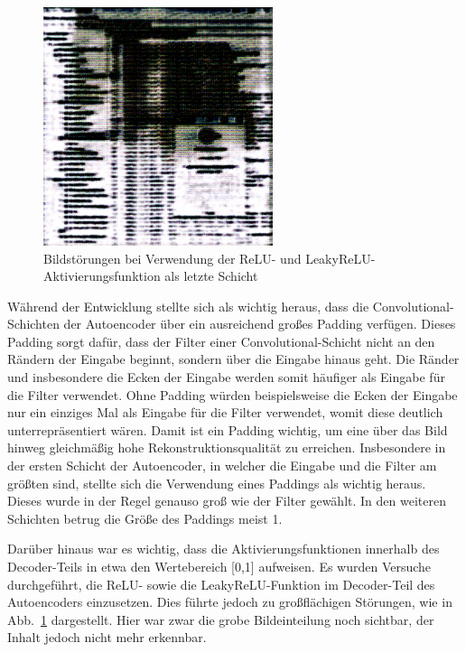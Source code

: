 \begin{figure}[htbp]
    \centering
    \includegraphics[width=0.6\textwidth]{bilder/image_relu_problems.png}
    \caption{Bildstörungen bei Verwendung der ReLU- und LeakyReLU-Aktivierungsfunktion als letzte Schicht}
    \label{fig:image_relu_problems}
\end{figure}

Während der Entwicklung stellte sich als wichtig heraus, dass die Convolutional-Schichten der Autoencoder über ein ausreichend großes Padding verfügen. Dieses Padding sorgt dafür, dass der Filter einer Convolutional-Schicht nicht an den Rändern der Eingabe beginnt, sondern über die Eingabe hinaus geht. Die Ränder und insbesondere die Ecken der Eingabe werden somit häufiger als Eingabe für die Filter verwendet. Ohne Padding würden beispielsweise die Ecken der Eingabe nur ein einziges Mal als Eingabe für die Filter verwendet, womit diese deutlich unterrepräsentiert wären. Damit ist ein Padding wichtig, um eine über das Bild hinweg gleichmäßig hohe Rekonstruktionsqualität zu erreichen. Insbesondere in der ersten Schicht der Autoencoder, in welcher die Eingabe und die Filter am größten sind, stellte sich die Verwendung eines Paddings als wichtig heraus. Dieses wurde in der Regel genauso groß wie der Filter gewählt. In den weiteren Schichten betrug die Größe des Paddings meist 1.

Darüber hinaus war es wichtig, dass die Aktivierungsfunktionen innerhalb des Decoder-Teils in etwa den Wertebereich [0,1] aufweisen. Es wurden Versuche durchgeführt, die ReLU- sowie die LeakyReLU-Funktion im Decoder-Teil des Autoencoders einzusetzen. Dies führte jedoch zu großflächigen Störungen, wie in Abb.~\ref{fig:image_relu_problems} dargestellt. Hier war zwar die grobe Bildeinteilung noch sichtbar, der Inhalt jedoch nicht mehr erkennbar.

